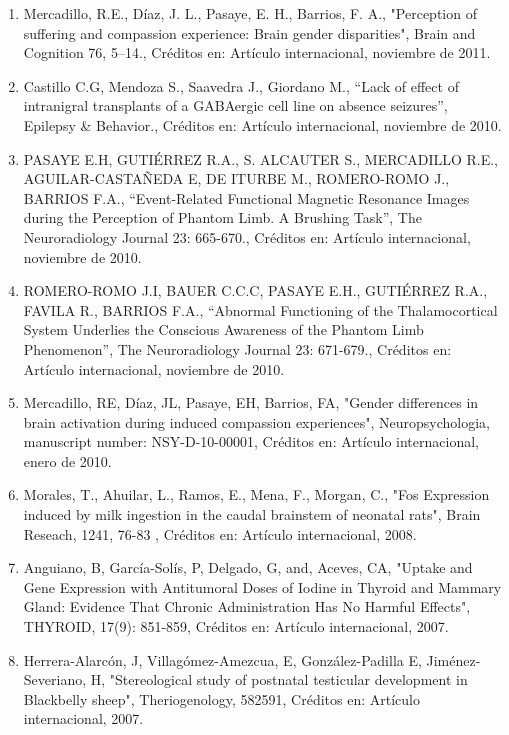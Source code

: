 \begin{enumerate}
\item Mercadillo, R.E., Díaz, J. L., Pasaye, E. H., Barrios, F. A., "Perception of suffering and compassion experience: 
Brain 
gender disparities", Brain and Cognition 76, 5–14., Créditos en: Artículo internacional, noviembre de 2011.

\item Castillo C.G, Mendoza S., Saavedra J., Giordano M., “Lack of effect of intranigral transplants of a GABAergic cell 
line 
on absence seizures”, Epilepsy \& Behavior., Créditos en: Artículo internacional, noviembre de 2010.

\item PASAYE E.H, GUTIÉRREZ R.A., S. ALCAUTER S., MERCADILLO R.E., AGUILAR-CASTAÑEDA E, DE ITURBE M., ROMERO-ROMO J., 
BARRIOS 
F.A., “Event-Related Functional Magnetic Resonance Images during the Perception of Phantom Limb. A Brushing Task”, The 
Neuroradiology Journal 23: 665-670., Créditos en: Artículo internacional, noviembre de 2010.

\item ROMERO-ROMO J.I, BAUER C.C.C, PASAYE E.H., GUTIÉRREZ R.A., FAVILA R., BARRIOS F.A., “Abnormal Functioning of the 
Thalamocortical System Underlies the Conscious Awareness of the Phantom Limb Phenomenon”, The Neuroradiology Journal 23: 
671-679., Créditos en: Artículo internacional, noviembre de 2010.

\item Mercadillo, RE, Díaz, JL, Pasaye, EH, Barrios, FA, "Gender differences in brain activation during induced compassion 
experiences", Neuropsychologia, manuscript number: NSY-D-10-00001, Créditos en: Artículo internacional, enero de 2010.

\item Morales, T., Ahuilar, L., Ramos, E., Mena, F., Morgan, C., "Fos Expression induced by milk ingestion in the caudal 
brainstem of neonatal rats", Brain Reseach, 1241, 76-83 , Créditos en: Artículo internacional, 2008.

\item Anguiano, B, García-Solís, P, Delgado, G, and, Aceves, CA, "Uptake and Gene Expression with Antitumoral Doses of 
Iodine 
in Thyroid and Mammary Gland: Evidence That Chronic Administration Has No Harmful Effects", THYROID, 17(9): 851-859, 
Créditos en: Artículo internacional, 2007.

\item Herrera-Alarcón, J, Villagómez-Amezcua, E, González-Padilla E, Jiménez-Severiano, H, "Stereological study of 
postnatal 
testicular development in Blackbelly sheep", Theriogenology, 582591, Créditos en: Artículo internacional, 2007.


\end{enumerate}
